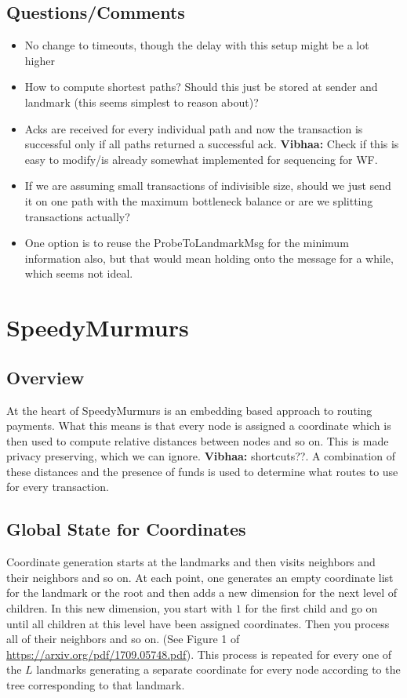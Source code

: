 \documentclass[a4paper]{article}
\newcommand{\vls}[1]{{\color{blue} \textbf{Vibhaa:} {#1}}}
\begin{document}
\subsection{Questions/Comments}
\begin{itemize}
    \item No change to timeouts, though the delay with this setup might be a lot higher

    \item How to compute shortest paths? Should this just be stored at sender and landmark (this seems simplest
        to reason about)?

    \item Acks are received for every individual path and now the transaction is successful only if all paths
        returned a successful ack. \vls{Check if this is easy to modify/is already somewhat implemented for 
        sequencing for WF}.

    \item If we are assuming small transactions of indivisible size, should we just send it on one path
        with the maximum bottleneck balance or are we splitting transactions actually?

    \item One option is to reuse the ProbeToLandmarkMsg for the minimum information also, but that would mean 
        holding onto the message for a while, which seems not ideal.

\end{itemize}

\section{SpeedyMurmurs}

\subsection{Overview}
At the heart of SpeedyMurmurs is an embedding based approach to routing payments. What this means is that every
node is assigned a coordinate which is then used to compute relative distances between nodes and so on. This is
made privacy preserving, which we can ignore. \vls{shortcuts??}. A combination of these distances and the 
presence of funds is used to determine what routes to use for every transaction.

\subsection{Global State for Coordinates}
Coordinate generation starts at the landmarks and then visits neighbors and their neighbors and so on. At each
point, one generates an empty coordinate list for the landmark or the root and then adds a new dimension for 
the next level of children. In this new dimension, you start with $1$ for the first child and go on until all 
children at this level have been assigned coordinates. Then you process all of their neighbors and so on.
(See Figure 1 of \url{https://arxiv.org/pdf/1709.05748.pdf}). This process is repeated for every one of the $L$ landmarks generating a separate coordinate for every node according to the tree corresponding to that landmark.
\end{document}
